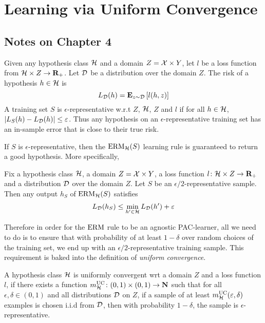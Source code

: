 \chapter{Learning via Uniform Convergence}

\section*{Notes on Chapter 4}

Given any hypothesis class $\mathcal{H}$ and a domain $Z = \mathcal{X} \times Y$, let
$l$ be a loss function from $\mathcal{H} \times Z \rightarrow \mathbf{R}_{+}$. Let
$\mathcal{D}$ be a distribution over the domain $Z$. The risk of a hypothesis $h \in
\mathcal{H}$ is
\[
    L_{\mathcal{D}}(h) = \mathbf{E}_{z \sim \mathcal{D}} \left [ l(h, z) \right ]
\]
A training set $S$ is $\epsilon$-representative w.r.t $Z$, $\mathcal{H}$, $Z$ and
$l$ if for all $h \in \mathcal{H}$, $|L_S (h) - L_{\mathcal{D}} (h)| \leq \varepsilon$.
Thus any hypothesis on an $\epsilon$-representative training set has an
in-sample error that is close to their true risk.

If $S$ is $\epsilon$-representative, then the $\operatorname{ERM}_{\mathcal{H}}(S)$ learning
rule is guaranteed to return a good hypothesis. More specifically,
\begin{lemma}
\label{lemma:epsilon_representative}
Fix a hypothesis class $\mathcal{H}$, a domain $Z = \mathcal{X} \times Y$, a loss
function $l \colon \mathcal{H} \times Z \rightarrow \mathbf{R}_{+}$ and a distribution
$\mathcal{D}$ over the domain $Z$. Let $S$ be an $\epsilon/2$-representative sample.
Then any output $h_S$ of $\operatorname{ERM}_{\mathcal{H}}(S)$ satisfies
\[
    L_{\mathcal{D}} (h_S) \leq \min_{h' \in \mathcal{H}} L_{\mathcal{D}}(h') + \varepsilon
\]
\end{lemma}

Therefore in order for the $\operatorname{ERM}$ rule to be an agnostic PAC-learner, all we
need to do is to ensure that with probability of at least $1 - \delta$ over
random choices of the training set, we end up with an
$\epsilon/2$-representative training sample. This requirement is baked into
the definition of \emph{uniform convergence}.

\begin{definition}
A hypothesis class $\mathcal{H}$ is uniformly convergent wrt a domain $Z$
and a loss function $l$, if there exists a function
$m_{\mathcal{H}}^{\text{UC}} \colon (0, 1) \times (0, 1) \rightarrow \mathbf{N}$ such that
for all $\epsilon, \delta \in (0, 1)$ and all distributions $\mathcal{D}$ on $Z$,
if a sample of at least $m_{\mathcal{H}}^{\text{UC}}(\varepsilon, \delta)$ examples is chosen
i.i.d from $\mathcal{D}$, then with probability $1 - \delta$, the sample is
$\epsilon$-representative.
\end{definition}

